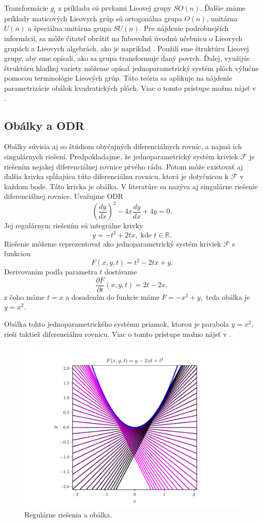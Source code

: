 Transformácie $g_{t}$ z príkladu sú prvkami Lieovej grupy $SO(n)$. Ďalšie známe príklady maticových Lieovych grúp sú ortogonálna grupa $O(n)$, unitárna $U(n)$ a špeciálna unitárna grupa $SU(n).$ 
Pre nájdenie podrobnejších informácií, sa môže čitateľ obrátiť na ľubovoľnú úvodnú učebnicu o Lieovych grupách a Lieovych algebrách, ako je napríklad \cite{Lee12}.
Použili sme štruktúru Lieovej grupy, aby sme opísali, ako sa grupa transformuje daný povrch. Ďalej, využijúc štruktúru hladkej variety môžeme opísať jednoparametrický systém plôch výlučne pomocou terminológie Lieových grúp. Táto teória sa aplikuje na nájdenie parametrizácie obálok kvadratických plôch. Viac o tomto prístupe možno nájsť v \cite{Vra22}. 

\subsection{Obálky a ODR}
Obálky súvisia aj so štúdiom obyčajných diferenciálnych rovníc, a najmä ich singulárnych riešení. Predpokladajme, že jednoparametrický systém kriviek $\mathcal{F}$ je riešením nejakej diferenciálnej rovnice prvého rádu. Potom môže existovať aj ďalšia krivka spĺňajúca túto diferenciálnu rovnicu, ktorá je dotyčnicou k $\mathcal{F}$ v každom bode. Táto krivka je obálka. V literatúre sa nazýva aj singulárne riešenie diferenciálnej rovnice.
Uvažujme ODR 
$$
\left(\frac{dy}{dx}\right)^2 - 4x\frac{dy}{dx} + 4y = 0.
$$
Jej regulárnym riešením sú integrálne krivky 
$$ y = - t^2 + 2tx, \text{ kde } t \in \mathbb{R}.$$
Riešenie môžeme reprezentovať ako jednoparametrický systém kriviek $\mathcal{F}$ s funkciou
$$F(x,y,t) = t^2 - 2tx + y. $$
Derivovaním podľa parametra $t$ dostávame
$$\dfrac{\partial F}{\partial t} (x,y,t) = 2t - 2x, $$
z čoho máme $t=x$ a dosadením do funkcie máme $F=-x^2+y,$ teda obálka je $y=x^2.$

Obálka tohto jednoparametrického systému priamok, ktorou je parabola $y = x^2$, rieši taktiež diferenciálnu rovnicu. Viac o tomto prístupe možno nájsť v \cite{Gro97}.

\begin{figure}[H]
	\centering
	\includegraphics[trim={0 0.35cm 0 0.85cm},clip]{images/odr.pdf}
	\caption{Regulárne riešenia a obálka.}
	\label{fig:odr}
\end{figure}

